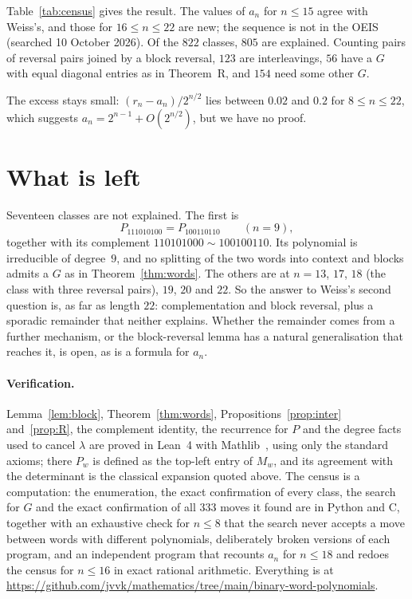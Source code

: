 \documentclass[11pt]{article}
\theoremstyle{remark}
\begin{document}
Table~\ref{tab:census} gives the result. The values of $a_n$ for $n\le15$ agree with Weiss's, and those for
$16\le n\le22$ are new; the sequence is not in the OEIS (searched 10 October 2026). Of the $822$ classes, $805$ are
explained. Counting pairs of reversal pairs joined by a block reversal, $123$ are interleavings, $56$ have a $G$ with
equal diagonal entries as in Theorem~R, and $154$ need some other $G$.

The excess stays small: $(r_n-a_n)/2^{n/2}$ lies between $0.02$ and $0.2$ for $8\le n\le22$, which suggests
$a_n=2^{n-1}+O(2^{n/2})$, but we have no proof.

\section{What is left}

Seventeen classes are not explained. The first is
\[
P_{111010100}=P_{100110110}\qquad(n=9),
\]
together with its complement $110101000\sim100100110$. Its polynomial is irreducible of degree~$9$, and no splitting
of the two words into context and blocks admits a $G$ as in Theorem~\ref{thm:words}. The others are at $n=13$, $17$,
$18$ (the class with three reversal pairs), $19$, $20$ and $22$. So the answer to Weiss's
second question is, as far as length $22$: complementation and block reversal, plus a sporadic remainder that
neither explains. Whether the remainder comes from a further mechanism, or the block-reversal lemma has a natural
generalisation that reaches it, is open, as is a formula for $a_n$.

\paragraph{Verification.} Lemma~\ref{lem:block}, Theorem~\ref{thm:words}, Propositions~\ref{prop:inter}
and~\ref{prop:R}, the complement identity, the recurrence for $P$ and the degree facts used to cancel $\lambda$ are
proved in Lean~4 with Mathlib~\cite{mathlib}, using only the standard axioms; there $P_w$ is defined as the top-left
entry of $M_w$, and its agreement with the determinant is the classical expansion quoted above. The census is a
computation: the enumeration, the exact confirmation of every class, the search for $G$ and the exact confirmation of
all $333$ moves it found are in Python and C, together with an exhaustive check for $n\le8$ that the search never
accepts a move between words with different polynomials, deliberately broken versions of each program, and an
independent program that recounts $a_n$ for $n\le18$ and redoes the census for $n\le16$
in exact rational arithmetic. Everything is at \url{https://github.com/jvvk/mathematics/tree/main/binary-word-polynomials}.
\end{document}
